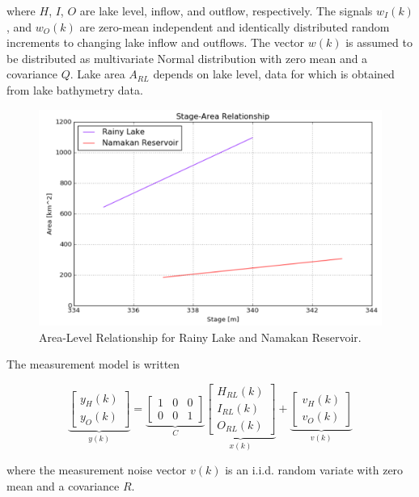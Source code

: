 \documentclass[preprint,times]{elsarticle}
\begin{document}
\noindent
where $H$, $I$, $O$ are lake level, inflow, and outflow, respectively. The signals $w_I(k)$, and $w_O(k)$ are zero-mean independent and identically distributed random increments to changing lake inflow and outflows. The vector $w(k)$ is assumed to be distributed as multivariate Normal distribution with zero mean and a covariance $Q$. Lake area $A_{RL}$ depends on lake level, data for which is obtained from lake bathymetry data.

\begin{figure}
\includegraphics[width=\linewidth]{StageArea}
\caption{Area-Level Relationship for Rainy Lake and Namakan Reservoir.}\label{figure:6}
\end{figure}

The measurement model is written

$$\underbrace{\left[\begin{array}{c} y_H(k) \\ y_O(k) \end{array}\right]}_{y(k)} = \underbrace{\left[\begin{array}{ccc} 1 & 0 & 0 \\ 0 & 0 & 1 \end{array}\right]}_{C} \underbrace{\left[\begin{array}{c} H_{RL}(k) \\ I_{RL}(k) \\ O_{RL}(k) \end{array}\right]}_{x(k)} +  \underbrace{\left[\begin{array}{c}  v_{H}(k) \\ v_{O}(k) \end{array}\right]}_{v(k)} $$

\noindent
where the measurement noise vector $v(k)$ is an i.i.d. random variate with zero mean and a covariance $R$.
\end{document}
